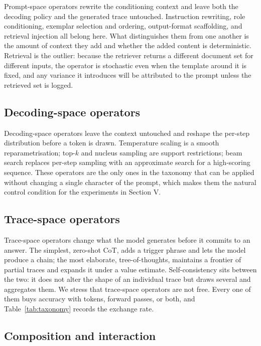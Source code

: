 \documentclass[conference]{IEEEtran}
\begin{document}
Prompt-space operators rewrite the conditioning context and leave both the decoding policy and the generated trace untouched. Instruction rewriting, role conditioning, exemplar selection and ordering, output-format scaffolding, and retrieval injection all belong here. What distinguishes them from one another is the amount of context they add and whether the added content is deterministic. Retrieval is the outlier: because the retriever returns a different document set for different inputs, the operator is stochastic even when the template around it is fixed, and any variance it introduces will be attributed to the prompt unless the retrieved set is logged.

\subsection{Decoding-space operators}

Decoding-space operators leave the context untouched and reshape the per-step distribution before a token is drawn. Temperature scaling is a smooth reparametrisation; top-$k$ and nucleus sampling are support restrictions; beam search replaces per-step sampling with an approximate search for a high-scoring sequence. These operators are the only ones in the taxonomy that can be applied without changing a single character of the prompt, which makes them the natural control condition for the experiments in Section V.

\subsection{Trace-space operators}

Trace-space operators change what the model generates before it commits to an answer. The simplest, zero-shot CoT, adds a trigger phrase and lets the model produce a chain; the most elaborate, tree-of-thoughts, maintains a frontier of partial traces and expands it under a value estimate. Self-consistency sits between the two: it does not alter the shape of an individual trace but draws several and aggregates them. We stress that trace-space operators are not free. Every one of them buys accuracy with tokens, forward passes, or both, and Table~\ref{tab:taxonomy} records the exchange rate.

\subsection{Composition and interaction}
\end{document}

